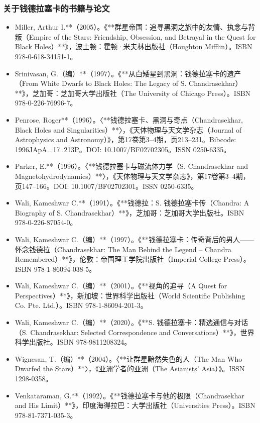 \subsubsection{关于钱德拉塞卡的书籍与论文}
\begin{itemize}
\item Miller, Arthur I.**（2005）。《**群星帝国：追寻黑洞之旅中的友情、执念与背叛（Empire of the Stars: Friendship, Obsession, and Betrayal in the Quest for Black Holes）**》，波士顿：霍顿·米夫林出版社（Houghton Mifflin）。ISBN 978-0-618-34151-1。
\item Srinivasan, G.（编）**（1997）。《**从白矮星到黑洞：钱德拉塞卡的遗产（From White Dwarfs to Black Holes: The Legacy of S. Chandrasekhar）**》，芝加哥：芝加哥大学出版社（The University of Chicago Press）。ISBN 978-0-226-76996-7。
\item Penrose, Roger**（1996）。〈**钱德拉塞卡、黑洞与奇点（Chandrasekhar, Black Holes and Singularities）**〉，《天体物理与天文学杂志（Journal of Astrophysics and Astronomy）》，第17卷第3–4期，页213–231。Bibcode: 1996JApA...17..213P。DOI: 10.1007/BF02702305。ISSN 0250-6335。
\item Parker, E.**（1996）。〈**钱德拉塞卡与磁流体力学（S. Chandrasekhar and Magnetohydrodynamics）**〉，《天体物理与天文学杂志》，第17卷第3–4期，页147–166。DOI: 10.1007/BF02702301。ISSN 0250-6335。
\item Wali, Kameshwar C.**（1991）。《**钱德拉：S. 钱德拉塞卡传（Chandra: A Biography of S. Chandrasekhar）**》，芝加哥：芝加哥大学出版社。ISBN 978-0-226-87054-0。
\item Wali, Kameshwar C.（编）**（1997）。《**钱德拉塞卡：传奇背后的男人——怀念钱德拉（Chandrasekhar: The Man Behind the Legend – Chandra Remembered）**》，伦敦：帝国理工学院出版社（Imperial College Press）。ISBN 978-1-86094-038-5。
\item Wali, Kameshwar C.（编）**（2001）。《**视角的追寻（A Quest for Perspectives）**》，新加坡：世界科学出版社（World Scientific Publishing Co. Pte. Ltd.）。ISBN 978-1-86094-201-3。
\item Wali, Kameshwar C.（编）**（2020）。《**S. 钱德拉塞卡：精选通信与对话（S. Chandrasekhar: Selected Correspondence and Conversations）**》，世界科学出版社。ISBN 978-9811208324。
\item Wignesan, T.（编）**（2004）。〈**让群星黯然失色的人（The Man Who Dwarfed the Stars）**〉，《亚洲学者的亚洲（The Asianists’ Asia）》。ISSN 1298-0358。
\item Venkataraman, G.**（1992）。《**钱德拉塞卡与他的极限（Chandrasekhar and His Limit）**》，印度海得拉巴：大学出版社（Universities Press）。ISBN 978-81-7371-035-3。

\end{itemize}
